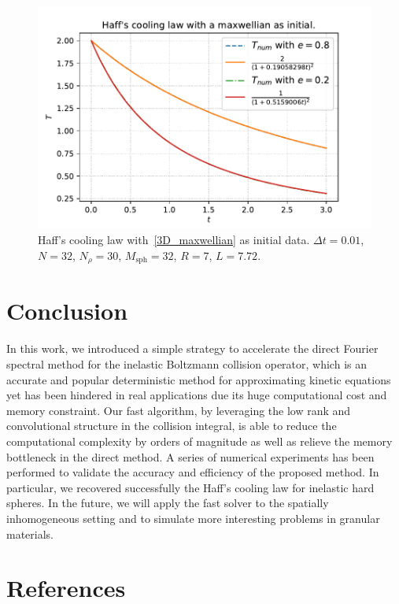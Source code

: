 \documentclass[review,times]{elsarticle}
\begin{document}
\begin{figure}[htp!]
  \centering
  \includegraphics[width = .8\linewidth]{Haff_cooling_maxwellian}
  \caption{\color{red} Haff's cooling law {\color{red} with~\eqref{3D_maxwellian} as initial data}. $\Delta t=0.01$, $N=32$, $N_{\rho}=30$, $M_{\text{sph}}=32$, $R=7$, $L=7.72$.}
  \label{Haff_cooling_maxwellian}
\end{figure}


\section{Conclusion}

In this work, we introduced a simple strategy to accelerate the direct Fourier spectral method for the inelastic Boltzmann collision operator, which is an accurate and popular deterministic method for approximating kinetic equations yet has been hindered in real applications due its huge computational cost and memory constraint. Our fast algorithm, by leveraging the low rank and convolutional structure in the collision integral, is able to reduce the computational complexity by orders of magnitude as well as relieve the memory bottleneck in the direct method. A series of numerical experiments has been performed to validate the accuracy and efficiency of the proposed method. In particular, we recovered successfully the Haff's cooling law for inelastic hard spheres. In the future, we will apply the fast solver to the spatially inhomogeneous setting and to simulate more interesting problems in granular materials.




\section*{References}


\end{document}
